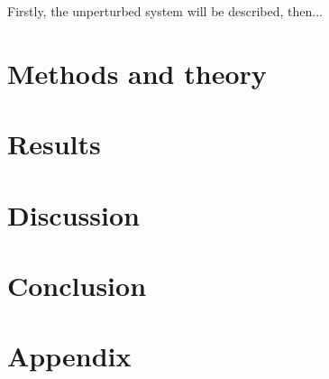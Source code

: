 \documentclass[12pt,english,a4paper]{article}
\begin{document}
Firstly, the unperturbed system will be described, then...


\section{Methods and theory} \label{methods_and_theory}

\section{Results} \label{results}

\section{Discussion} \label{discussion}

\section{Conclusion} \label{conclusion}

\section{Appendix} \label{appendix}

\printbibliography
\end{document}

